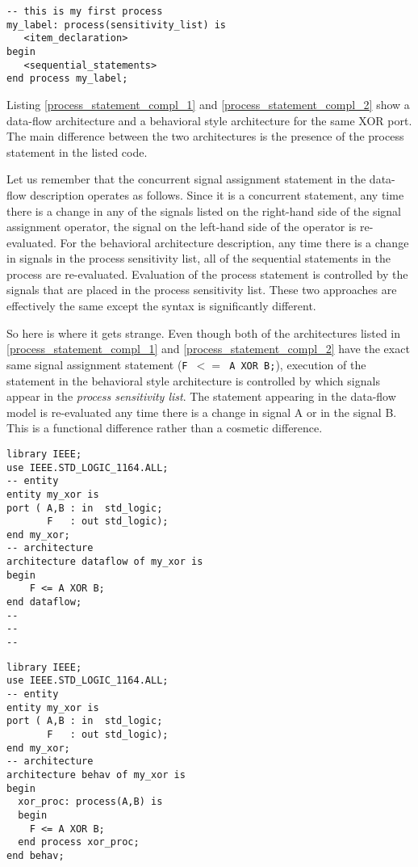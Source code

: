 \begin{lstlisting}[label=process_statement, caption=Syntax for the process statement.]
-- this is my first process
my_label: process(sensitivity_list) is
   <item_declaration>
begin
   <sequential_statements>
end process my_label;
\end{lstlisting}

Listing \ref{process_statement_compl_1} and \ref{process_statement_compl_2} show a data-flow architecture and a behavioral style architecture for the same XOR port. The main difference between the two architectures is the presence of the process statement in the listed code. 

Let us remember that the concurrent signal assignment statement in the data-flow description operates as follows. Since it is a concurrent statement, any time there is a change in any of the signals listed on the right-hand side of the signal assignment operator, the signal on the left-hand side of the operator is re-evaluated. For the behavioral architecture description, any time there is a change in signals in the process sensitivity list, all of the sequential statements in the process are re-evaluated. Evaluation of the process statement is controlled by the signals that are placed in the process sensitivity list. These two approaches are effectively the same except the syntax is significantly different. 

So here is where it gets strange. Even though both of the architectures listed in \ref{process_statement_compl_1} and \ref{process_statement_compl_2} have the exact same signal assignment statement (\texttt{F $<=$ A XOR B;}), execution of the statement in the behavioral style architecture is controlled by which signals appear in the \textit{process sensitivity list}. The statement appearing in the data-flow model is re-evaluated any time there is a change in signal A or in the signal B. This is a functional difference rather than a cosmetic difference.

\noindent
\begin{minipage}{0.49\linewidth}
\begin{lstlisting}[label=process_statement_compl_1, caption=Data-flow architecture.]
library IEEE;
use IEEE.STD_LOGIC_1164.ALL;
-- entity
entity my_xor is
port ( A,B : in  std_logic;
       F   : out std_logic);
end my_xor;
-- architecture
architecture dataflow of my_xor is
begin
	F <= A XOR B;
end dataflow;
--
--
--
\end{lstlisting}
\end{minipage}
\begin{minipage}{0.49\linewidth}
\begin{lstlisting}[label=process_statement_compl_2, caption=Behavioral architecture.]
library IEEE;
use IEEE.STD_LOGIC_1164.ALL;
-- entity
entity my_xor is
port ( A,B : in  std_logic;
       F   : out std_logic);
end my_xor;
-- architecture
architecture behav of my_xor is
begin
  xor_proc: process(A,B) is
  begin
	F <= A XOR B;
  end process xor_proc;
end behav;

\end{lstlisting}
\end{minipage}

